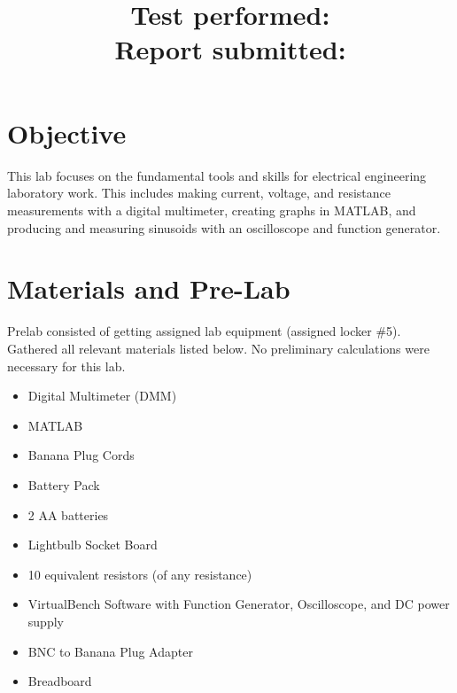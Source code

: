 \documentclass[10pt]{article}
\title{
	\textbf{\courseTitle} \\
	\textbf{\documentTitle} \\
	\bigskip
	\textbf{\large{Test performed: \testDate}} \\
	\textbf{\large{Report submitted: \reportDate}} \\
	\bigskip
	\bigskip
}
\author{\documentAuthor}
\date{}
\begin{document}
	
	\maketitle
	
	\newpage
	
	\section{Objective}
	
	This lab focuses on the fundamental tools and skills for electrical engineering laboratory work. This includes making current, voltage, and resistance measurements with a digital multimeter, creating graphs in MATLAB, and producing and measuring sinusoids with an oscilloscope and function generator.  
	
	\medskip
	
	
	
	\section{Materials and Pre-Lab}
	
	Prelab consisted of getting assigned lab equipment (assigned locker \#5). Gathered all relevant materials listed below. 
	No preliminary calculations were necessary for this lab. 
	
	\begin{itemize}
		\item Digital Multimeter (DMM)
		\item MATLAB
		\item Banana Plug Cords
		\item Battery Pack 
		\item 2 AA batteries
		\item Lightbulb Socket Board
		\item 10 equivalent resistors (of any resistance)
		\item VirtualBench Software with Function Generator, Oscilloscope, and DC power supply
		\item BNC to Banana Plug Adapter
		\item Breadboard
		
	\end{itemize}
	
\end{document}
